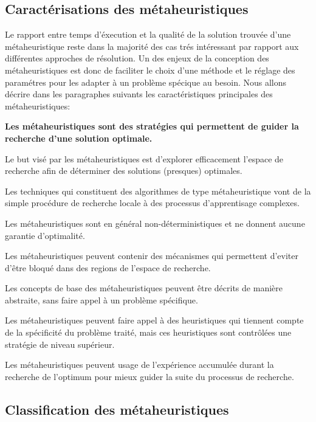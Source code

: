 \documentclass[a4paper,11pt,oneside]{report}
\theoremstyle{plain}
\newcommand{\0}{/ \! \! \! 0}
\theoremstyle{plain}
\begin{document}
\subsection{Caract\'erisations des m\'etaheuristiques}
 Le rapport entre temps d'\'execution et la qualit\'e de la solution trouv\'ee d'une m\'etaheuristique reste dans la majorit\'e des cas tr\'es int\'eressant 
par rapport aux diff\'erentes approches de r\'esolution. Un des enjeux de la conception des m\'etaheuristiques est donc de faciliter le choix d'une m\'ethode 
et le r\'eglage des param\'etres pour les adapter \`a un probl\`eme sp\'ecique au besoin.
Nous allons d\'ecrire dans les paragraphes suivants les caract\'eristiques principales des m\'etaheuristiques: 

{\bf
{} Les m\'etaheuristiques sont des strat\'egies qui permettent de guider la recherche d'une solution optimale.

 Le but vis\'e par les m\'etaheuristiques est d'explorer efficacement l'espace de recherche afin de d\'eterminer des solutions (presques) optimales.

 Les techniques qui constituent des algorithmes de type m\'etaheuristique vont de la simple proc\'edure de recherche locale \`a des processus 
d'apprentisage complexes.

 Les m\'etaheuristiques sont en g\'en\'eral non-d\'eterministiques et ne donnent aucune garantie d'optimalit\'e.

 Les m\'etaheuristiques peuvent contenir des m\'ecanismes qui permettent d'eviter d'\^etre bloqu\'e dans des regions de l'espace de recherche.

 Les concepts de base des m\'etaheuristiques peuvent \^etre d\'ecrits de mani\`ere abstraite, sans faire appel \`a un probl\`eme sp\'ecifique.

 Les m\'etaheuristiques peuvent faire appel \`a des heuristiques qui tiennent compte de la sp\'ecificit\'e du probl\`eme trait\'e, mais ces
heuristiques sont contr\^ol\'ees une strat\'egie de niveau sup\'erieur.

 Les m\'etaheuristiques peuvent usage de l'exp\'erience accumul\'ee durant la recherche de l'optimum pour mieux guider la suite du processus de 
recherche.
}
\subsection{Classification des m\'etaheuristiques}
\end{document}
